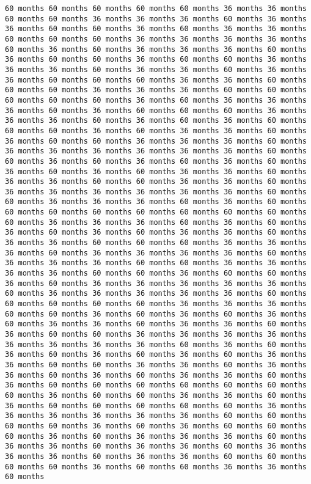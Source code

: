 \documentclass[11pt]{article}
\begin{document}
\begin{Verbatim}[commandchars=\\\{\}, frame=single, framerule=2mm, rulecolor=\color{outerrorbackground}]
60 months 60 months 60 months 60 months 60 months 36 months 36 months 60 months 60 months 36 months 36 months 36 months 60 months 36 months 36 months 60 months 60 months 36 months 60 months 36 months 36 months 60 months 60 months 60 months 36 months 36 months 36 months 36 months 60 months 36 months 60 months 36 months 36 months 36 months 60 months 36 months 60 months 60 months 36 months 60 months 60 months 36 months 36 months 36 months 60 months 36 months 36 months 60 months 36 months 36 months 60 months 60 months 60 months 36 months 36 months 60 months 60 months 60 months 36 months 36 months 36 months 60 months 60 months 60 months 60 months 60 months 36 months 60 months 36 months 36 months 36 months 60 months 36 months 60 months 60 months 60 months 36 months 36 months 36 months 60 months 36 months 60 months 36 months 60 months 60 months 60 months 36 months 60 months 36 months 36 months 60 months 36 months 60 months 60 months 36 months 36 months 36 months 60 months 36 months 36 months 36 months 36 months 36 months 36 months 60 months 60 months 36 months 60 months 36 months 60 months 36 months 60 months 36 months 60 months 36 months 60 months 36 months 36 months 60 months 36 months 36 months 60 months 60 months 36 months 36 months 60 months 36 months 36 months 36 months 36 months 36 months 36 months 60 months 60 months 36 months 36 months 36 months 60 months 36 months 60 months 60 months 60 months 60 months 60 months 60 months 60 months 60 months 60 months 36 months 36 months 36 months 60 months 36 months 60 months 36 months 60 months 36 months 60 months 36 months 36 months 60 months 36 months 36 months 60 months 60 months 60 months 36 months 36 months 36 months 60 months 36 months 36 months 36 months 36 months 60 months 36 months 36 months 36 months 60 months 60 months 36 months 36 months 36 months 36 months 60 months 60 months 36 months 60 months 60 months 36 months 60 months 36 months 36 months 36 months 36 months 36 months 60 months 36 months 36 months 36 months 36 months 36 months 60 months 60 months 60 months 60 months 60 months 36 months 36 months 36 months 60 months 60 months 36 months 60 months 36 months 60 months 36 months 60 months 36 months 36 months 60 months 36 months 36 months 60 months 36 months 60 months 60 months 36 months 36 months 36 months 36 months 36 months 36 months 36 months 36 months 60 months 36 months 60 months 36 months 60 months 36 months 60 months 36 months 60 months 36 months 36 months 60 months 60 months 36 months 36 months 60 months 36 months 36 months 60 months 36 months 60 months 36 months 36 months 60 months 36 months 60 months 60 months 60 months 60 months 60 months 60 months 60 months 36 months 60 months 60 months 36 months 36 months 60 months 36 months 60 months 60 months 60 months 60 months 60 months 36 months 36 months 36 months 36 months 36 months 36 months 60 months 60 months 60 months 60 months 36 months 60 months 36 months 60 months 60 months 60 months 36 months 60 months 36 months 36 months 36 months 60 months 36 months 36 months 60 months 36 months 36 months 60 months 36 months 36 months 36 months 60 months 36 months 36 months 60 months 60 months 60 months 60 months 36 months 60 months 60 months 36 months 36 months 60 months 
\end{Verbatim}
\end{document}
